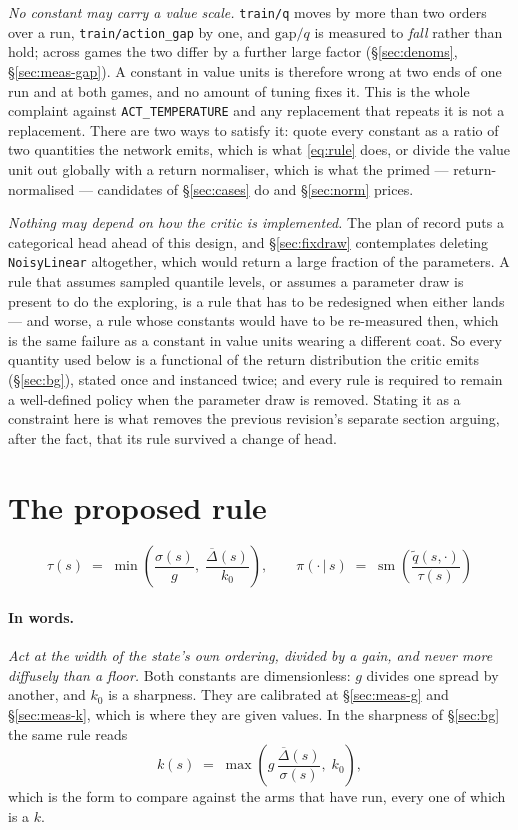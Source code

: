 \documentclass{article}
\DeclareMathOperator{\sm}{sm}
\newcommand{\gapbar}{\overline{\Delta}}
\newcommand{\srank}{\sigma}
\begin{document}
\emph{No constant may carry a value scale.} \texttt{train/q} moves by more than two orders over
a run, \texttt{train/action\_gap} by one, and $\mathrm{gap}/q$ is measured to \emph{fall} rather
than hold; across games the two differ by a further large factor (\S\ref{sec:denoms},
\S\ref{sec:meas-gap}). A constant in value units is therefore wrong at two ends of one run and at
both games, and no
amount of tuning fixes it. This is the whole complaint against \texttt{ACT\_TEMPERATURE} and any
replacement that repeats it is not a replacement. There are two ways to satisfy it: quote every
constant as a ratio of two quantities the network emits, which is what \eqref{eq:rule} does, or
divide the value unit out globally with a return normaliser, which is what the primed
--- return-normalised --- candidates of \S\ref{sec:cases} do and \S\ref{sec:norm} prices.

\emph{Nothing may depend on how the critic is implemented.} The plan of record puts a categorical
head ahead of this design, and \S\ref{sec:fixdraw} contemplates deleting \texttt{NoisyLinear}
altogether, which would return a large fraction of the parameters. A rule that assumes sampled
quantile
levels, or assumes a parameter draw is present to do the exploring, is a rule that has to be
redesigned when either lands --- and worse, a rule whose constants would have to be re-measured
then, which is the same failure as a constant in value units wearing a different coat. So every
quantity used below is a functional of the return distribution the critic emits
(\S\ref{sec:bg}), stated once and instanced twice; and every rule is required to remain a
well-defined policy when the parameter draw is removed. Stating it as a constraint here is what
removes the previous revision's separate section arguing, after the fact, that its rule survived
a change of head.

\section{The proposed rule}
\label{sec:rule}

\begin{equation}
  \boxed{\;
  \tau(s) \;=\; \min\!\left(\frac{\srank(s)}{g},\; \frac{\gapbar(s)}{k_0}\right),
  \qquad
  \pi(\cdot\,|\,s) \;=\; \sm\!\left(\frac{\tilde{q}(s,\cdot)}{\tau(s)}\right)
  \;}
  \label{eq:rule}
\end{equation}

\paragraph{In words.} \emph{Act at the width of the state's own ordering, divided by a gain, and
never more diffusely than a floor.} Both constants are dimensionless: $g$ divides one spread by
another, and $k_0$ is a sharpness. They are calibrated at \S\ref{sec:meas-g} and
\S\ref{sec:meas-k}, which is where they are given values. In the sharpness of \S\ref{sec:bg} the
same rule reads
\begin{equation}
  k(s) \;=\; \max\!\left(g\,\frac{\gapbar(s)}{\srank(s)},\; k_0\right),
  \label{eq:rule-k}
\end{equation}
which is the form to compare against the arms that have run, every one of which is a $k$.
\end{document}
